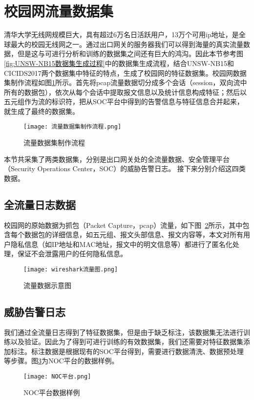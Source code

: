 \section{校园网流量数据集}
清华大学无线网规模巨大，具有超过6万名日活跃用户，13万个可用ip地址，是全球最大的校园无线网之一。通过出口网关的服务器我们可以得到海量的真实流量数据，但是这与可进行分析和训练的数据集之间还有巨大的鸿沟。因此本节参考图\ref{fig:UNSW-NB15数据集生成过程}中的数据集生成流程，结合UNSW-NB15和CICIDS2017两个数据集中特征的特点，生成了校园网的特征数据集。校园网数据集制作流程如图\ref{fig:流量数据集制作流程}所示。首先将pcap流量数据切分成多个会话（session，双向流中所有的数据包），依次从每个会话中提取报文信息以及统计信息构成特征；然后以五元组作为流的标识符，把从SOC平台中得到的告警信息与特征信息合并起来，就生成了最终的数据集。
\begin{figure}
    \centering
    \texttt{[image: 流量数据集制作流程.png]}
    \caption{流量数据集制作流程}
    \label{fig:流量数据集制作流程}
  \end{figure}


本节共采集了两类数据集，分别是出口网关处的全流量数据、安全管理平台（Security Operations Center，SOC）的威胁告警日志。
接下来分别介绍这四类数据。

\subsection{全流量日志数据}
校园网的原始数据为抓包（Packet Capture，pcap）流量，如下图~\ref{fig:wireshark}所示，其中包含每个数据包的详细信息，如五元组、报文头部信息、报文内容等，本文对所有用户隐私信息（如IP地址和MAC地址，报文中的明文信息等）都进行了匿名化处理，保证不会泄露用户的任何隐私信息。

\begin{figure}
    \centering
    \texttt{[image: wireshark流量图.png]}
    \caption{流量数据示意图}
    \label{fig:wireshark}
  \end{figure}



\subsection{威胁告警日志}
我们通过全流量日志得到了特征数据集，但是由于缺乏标注，该数据集无法进行训练以及验证。因此为了得到可进行训练的有效数据集，我们还需要对特征数据集添加标注。标注数据是根据现有的SOC平台得到，需要进行数据清洗、数据预处理等步骤。图\ref{fig:NOC平台数据样例}为NOC平台的数据样例。
\begin{figure}
    \centering
    \texttt{[image: NOC平台.png]}
    \caption{NOC平台数据样例}
    \label{fig:NOC平台数据样例}
  \end{figure}

